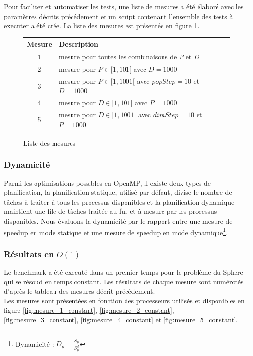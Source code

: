 Pour faciliter et automatiser les tests, une liste de mesures a été élaboré avec les paramètres décrits précédement et un script contenant l'ensemble des tests à executer a été crée. La liste des mesures est présentée en figure \ref{fig:liste_mesures}.

\begin{figure}[here]
  \centering
  \begin{tabular}{ | c | l | }
    \hline
    \textbf{Mesure} & \textbf{Description}\\\hline
    1 & mesure pour toutes les combinaisons de $P$ et $D$\\\hline
    2 & mesure pour $P \in [1, 101[$ avec $D = 1000$\\\hline
    3 & mesure pour $P \in [1, 1001[$ avec $popStep = 10$ et $D = 1000$\\\hline
    4 & mesure pour $D \in [1, 101[$ avec $P = 1000$\\\hline
    5 & mesure pour $D \in [1, 1001[$ avec $dimStep = 10$ et $P = 1000$\\\hline
  \end{tabular}
  \caption{Liste des mesures}
  \label{fig:liste_mesures}
\end{figure}

\subsubsection{Dynamicité}

Parmi les optimisations possibles en OpenMP, il existe deux types de planification, la planification statique, utilisé par défaut, divise le nombre de tâches à traiter à tous les processus disponibles et la planification dynamique maintient une file de tâches traitée au fur et à mesure par les processus disponibles. Nous évaluons la dynamicité par le rapport entre une mesure de speedup en mode statique et une mesure de speedup en mode dynamique\footnote{Dynamicité : $D_p = \frac{S_p}{S_p^d}$}.

\subsubsection{Résultats en $O(1)$}

Le benchmark a été executé dans un premier temps pour le problème du Sphere qui se résoud en temps constant. Les résultats de chaque mesure sont numérotés d'après le tableau des mesures décrit précédement.\\

Les mesures sont présentées en fonction des processeurs utilisés et disponibles en figure \ref{fig:mesure_1_constant}, \ref{fig:mesure_2_constant}, \ref{fig:mesure_3_constant}, \ref{fig:mesure_4_constant} et \ref{fig:mesure_5_constant}.

